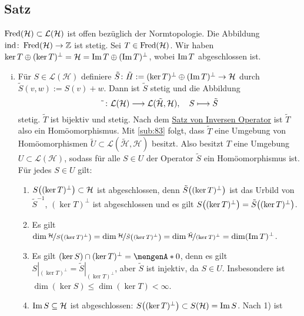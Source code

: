 \subsection[Satz: $\Fred(\mathcal{H}) \subset \mathcal{L}(\mathcal{H})$ ist offen und der Fredholm-Index $\idx$ ist stetig]{Satz} %
\label{sub:93}
$\Fred(\mathcal{H}) \subset \mathcal{L}(\mathcal{H})$ ist offen bezüglich der Normtopologie. Die Abbildung $\idx \colon \Fred(\mathcal{H}) \to \mathds{Z}$ ist stetig.
Sei $T \in \Fred(\mathcal{H})$. Wir haben $\ker T \oplus (\ker T)^\bot = \mathcal{H} = \im T \oplus (\im T)^\bot$, wobei $\im T$ abgeschlossen ist.
\begin{enumerate}[(i)]
	\item Für $S \in \mathcal{L}(\mathcal{H})$ definiere $\tilde{S} \colon \tilde{H} := (\ker T)^\bot \oplus (\im T)^\bot \to \mathcal{H}$ durch
	$\tilde{S}(v,w) := S(v)+w$. Dann ist $\tilde{S}$ stetig und die Abbildung 
	\[
		\tilde{\minwidthbox{ }{5pt}} \colon \mathcal{L}(\mathcal{H}) \longrightarrow \mathcal{L}(\tilde{\mathcal{H}}, \mathcal{H}) , \quad S \longmapsto \tilde{S}
	\]
	stetig. $\tilde{T}$ ist bijektiv und stetig. Nach dem \hyperref[sub:39]{Satz von Inversen Operator} ist $\tilde{T}$ also ein Homöomorphismus. Mit \ref{sub:83} folgt,
	dass $\tilde{T}$ eine Umgebung von Homöomorphismen $\tilde{U}\subset\mathcal{L}(\tilde{\mathcal{H}},\mathcal{H})$ besitzt. Also besitzt $T$ eine Umgebung 
	$U \subset \mathcal{L}(\mathcal{H})$, sodass für alle $S \in U$ der Operator $\tilde{S}$ ein Homöomorphismus ist. Für jedes $S \in U$ gilt: 
	\begin{enumerate}[1)]
		\item $S\enbrace*{(\ker T)^\bot} \subset \mathcal{H}$ ist abgeschlossen, denn $\tilde{S}\enbrace*{(\ker T)^\bot}$ ist das Urbild von $\tilde{S}^{-1}$, 
		$(\ker T)^\bot$ ist abgeschlossen und es gilt $S\enbrace*{(\ker T)^\bot} = \tilde{S} \enbrace*{(\ker T)^\bot}$.
		\item Es gilt
		\(
			\dim \nicefrac{\mathcal{H}}{S\enbrace*{(\ker T)^\bot}} = \dim \nicefrac{\mathcal{H}}{\tilde{S}\enbrace*{(\ker T)^\bot}} = \dim  
			\nicefrac{\tilde{\mathcal{H}}}{(\ker T)^\bot} = \dim (\im T)^\bot
		\).
		\item Es gilt $(\ker S) \cap (\ker T)^\bot = \set{0}$, denn es gilt $S|_{(\ker T)^\bot} = \tilde{S}|_{(\ker T)^\bot}$, aber $\tilde{S}$ ist injektiv, da $S \in U$. 
		Insbesondere ist $\dim (\ker S) \le \dim (\ker T) < \infty$.
		\item $\im S \subseteq \mathcal{H}$ ist abgeschlossen: $S \enbrace*{(\ker T)^\bot} \subset S(\mathcal{H})=\im S$. Nach 1) ist 

\end{enumerate}
\end{enumerate}

